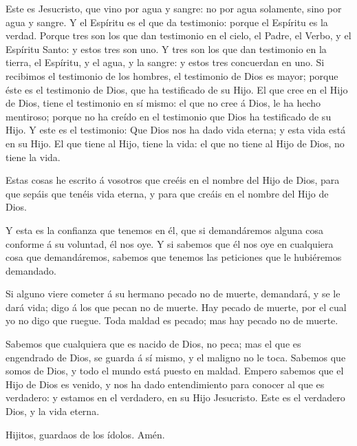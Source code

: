  Este es Jesucristo, que vino por agua y sangre: no por agua
solamente, sino por agua y sangre. Y el Espíritu es el que da
testimonio: porque el Espíritu es la verdad.  Porque tres
son los que dan testimonio en el cielo, el Padre, el Verbo, y el
Espíritu Santo: y estos tres son uno.  Y tres son los que
dan testimonio en la tierra, el Espíritu, y el agua, y la sangre: y
estos tres concuerdan en uno.  Si recibimos el testimonio de
los hombres, el testimonio de Dios es mayor; porque éste es el
testimonio de Dios, que ha testificado de su Hijo.  El que
cree en el Hijo de Dios, tiene el testimonio en sí mismo: el que no cree
á Dios, le ha hecho mentiroso; porque no ha creído en el testimonio que
Dios ha testificado de su Hijo.  Y este es el testimonio:
Que Dios nos ha dado vida eterna; y esta vida está en su Hijo.
 El que tiene al Hijo, tiene la vida: el que no tiene al
Hijo de Dios, no tiene la vida.

 Estas cosas he escrito á vosotros que creéis en el nombre
del Hijo de Dios, para que sepáis que tenéis vida eterna, y para que
creáis en el nombre del Hijo de Dios.

 Y esta es la confianza que tenemos en él, que si
demandáremos alguna cosa conforme á su voluntad, él nos oye.
 Y si sabemos que él nos oye en cualquiera cosa que
demandáremos, sabemos que tenemos las peticiones que le hubiéremos
demandado.

 Si alguno viere cometer á su hermano pecado no de muerte,
demandará, y se le dará vida; digo á los que pecan no de muerte. Hay
pecado de muerte, por el cual yo no digo que ruegue.  Toda
maldad es pecado; mas hay pecado no de muerte.

 Sabemos que cualquiera que es nacido de Dios, no peca; mas
el que es engendrado de Dios, se guarda á sí mismo, y el maligno no le
toca.  Sabemos que somos de Dios, y todo el mundo está
puesto en maldad.  Empero sabemos que el Hijo de Dios es
venido, y nos ha dado entendimiento para conocer al que es verdadero: y
estamos en el verdadero, en su Hijo Jesucristo. Este es el verdadero
Dios, y la vida eterna.

 Hijitos, guardaos de los ídolos. Amén.
